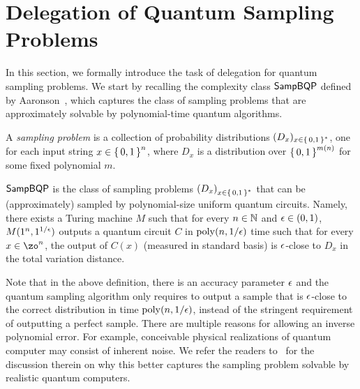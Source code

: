 \section{Delegation of Quantum Sampling Problems} \label{sec:samp_definition}

In this section, we formally introduce the task of delegation for quantum sampling problems. We start by recalling the complexity class $\SampBQP$ defined by Aaronson~\cite{aaronson_2013, Boson}, which captures the class of sampling problems that
are approximately solvable by polynomial-time quantum algorithms.


\begin{definition} 
    \label{dfn:sampling-problem}
    A \emph{sampling problem} is a collection of probability distributions $(D_x)_{x\in\set{0, 1}^*}$, one for each input string $x\in\set{0,1}^n$, where $D_x$ is a distribution over $\set{0,1}^{m(n)}$ for some fixed polynomial $m$.
\end{definition}

\begin{definition} [$\SampBQP$]
    $\SampBQP$ is the class of sampling problems $\left(D_x\right)_{x\in\set{0, 1}^*}$ that can be (approximately) sampled by polynomial-size uniform quantum circuits. Namely, there exists a Turing machine $M$ such that for every $n \in \mathbb{N}$ and $\epsilon \in (0,1)$, $M(1^n, 1^{1/\epsilon})$ outputs a quantum circuit $C$ in $\operatorname*{\operatorname{poly}}(n, 1/\epsilon)$ time such that for every $x \in \zo^n$, the output of $C(x)$ (measured in standard basis) is $\epsilon$-close to $D_x$ in the total variation distance. 
\end{definition}

Note that in the above definition, there is an accuracy parameter $\epsilon$ and the quantum sampling algorithm only requires to output a sample that is $\epsilon$-close to the correct distribution in time $\operatorname*{\operatorname{poly}}(n,1/\epsilon)$, instead of the stringent requirement of outputting a perfect sample. There are multiple reasons for allowing an inverse polynomial error. For example, conceivable physical realizations of quantum computer may consist of inherent noise. We refer the readers to~\cite{aaronson_2013, Boson} for the discussion therein on why this better captures the sampling problem solvable by realistic quantum computers. 

